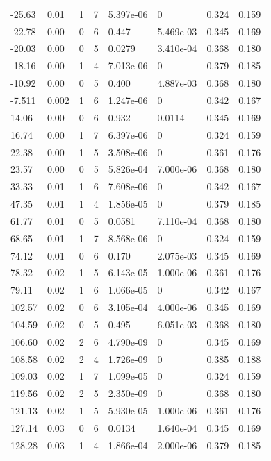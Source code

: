 \documentclass[preview]{standalone}
\begin{document}
{{\begin{tabular}{L{1.2cm}C{1.2cm} C{0.3cm}C{0.5cm} C{1.4cm}C{1.4cm} C{1.4cm}C{1.4cm}}
  -25.63  &  0.01  & 1     &  7 &  5.397e-06  & 0  & 0.324 &  0.159   \\ 
  -22.78  &  0.00  & 0     &  6 &  0.447  & 5.469e-03  & 0.345 &  0.169   \\ 
  -20.03  &  0.00  & 0     &  5 &  0.0279  & 3.410e-04  & 0.368 &  0.180   \\ 
  -18.16  &  0.00  & 1     &  4 &  7.013e-06  & 0  & 0.379 &  0.185   \\ 
  -10.92  &  0.00  & 0     &  5 &  0.400  & 4.887e-03  & 0.368 &  0.180   \\ 
  -7.511  &  0.002  & 1     &  6 &  1.247e-06  & 0  & 0.342 &  0.167   \\ 
  14.06  &  0.00  & 0     &  6 &  0.932  & 0.0114  & 0.345 &  0.169   \\ 
  16.74  &  0.00  & 1     &  7 &  6.397e-06  & 0  & 0.324 &  0.159   \\ 
  22.38  &  0.00  & 1     &  5 &  3.508e-06  & 0  & 0.361 &  0.176   \\ 
  23.57  &  0.00  & 0     &  5 &  5.826e-04  & 7.000e-06  & 0.368 &  0.180   \\ 
  33.33  &  0.01  & 1     &  6 &  7.608e-06  & 0  & 0.342 &  0.167   \\ 
  47.35  &  0.01  & 1     &  4 &  1.856e-05  & 0  & 0.379 &  0.185   \\ 
  61.77  &  0.01  & 0     &  5 &  0.0581  & 7.110e-04  & 0.368 &  0.180   \\ 
  68.65  &  0.01  & 1     &  7 &  8.568e-06  & 0  & 0.324 &  0.159   \\ 
  74.12  &  0.01  & 0     &  6 &  0.170  & 2.075e-03  & 0.345 &  0.169   \\ 
  78.32  &  0.02  & 1     &  5 &  6.143e-05  & 1.000e-06  & 0.361 &  0.176   \\ 
  79.11  &  0.02  & 1     &  6 &  1.066e-05  & 0  & 0.342 &  0.167   \\ 
  102.57  &  0.02  & 0     &  6 &  3.105e-04  & 4.000e-06  & 0.345 &  0.169   \\ 
  104.59  &  0.02  & 0     &  5 &  0.495  & 6.051e-03  & 0.368 &  0.180   \\ 
  106.60  &  0.02  & 2     &  6 &  4.790e-09  & 0  & 0.345 &  0.169   \\ 
  108.58  &  0.02  & 2     &  4 &  1.726e-09  & 0  & 0.385 &  0.188   \\ 
  109.03  &  0.02  & 1     &  7 &  1.099e-05  & 0  & 0.324 &  0.159   \\ 
  119.56  &  0.02  & 2     &  5 &  2.350e-09  & 0  & 0.368 &  0.180   \\ 
  121.13  &  0.02  & 1     &  5 &  5.930e-05  & 1.000e-06  & 0.361 &  0.176   \\ 
  127.14  &  0.03  & 0     &  6 &  0.0134  & 1.640e-04  & 0.345 &  0.169   \\ 
  128.28  &  0.03  & 1     &  4 &  1.866e-04  & 2.000e-06  & 0.379 &  0.185   \\ 
\hline 
\end{tabular} 

}}
\end{document}
